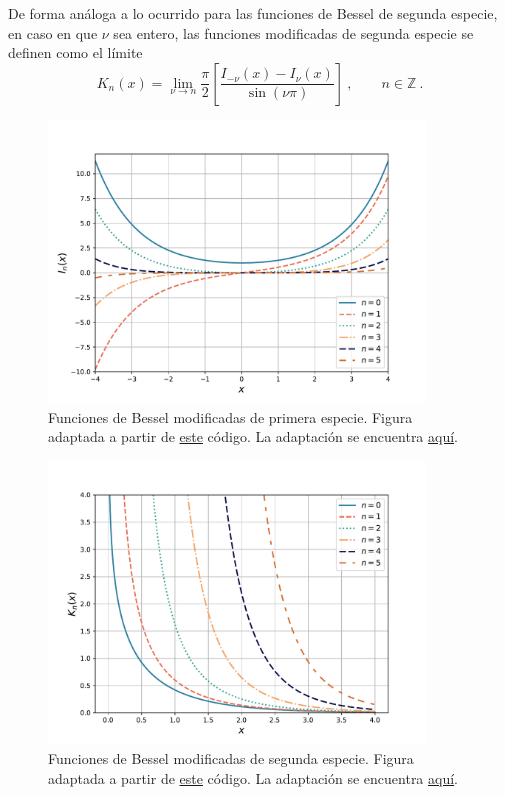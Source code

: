 De forma análoga a lo ocurrido para las funciones de Bessel de segunda especie, en caso en que $\nu$ sea entero, las funciones modificadas de segunda especie se definen como el límite
\begin{equation}
    K_n(x) = \lim_{\nu \to n} \frac{\pi}{2} \left[ \frac{I_{-\nu}(x) - I_\nu(x)}{\sin(\nu \pi)} \right] \ , \qquad n \in \mathbb{Z} \ .
\end{equation}

\begin{figure}[htbp]
    \centering
    \includegraphics[width = 10cm]{Figuras/Bessel-modified-first-kind.pdf}
    \caption{Funciones de Bessel modificadas de primera especie. Figura adaptada a partir de \href{https://github.com/gfrubi/FM2/blob/master/figuras-editables/fig-Bessel.py}{este} código. La adaptación se encuentra \href{https://github.com/Pedroga-cc/Fisica-Matematica-II/blob/main/Figuras/Plotter_Bessel.py}{aquí}.}
    \label{fig:Bessel_modificada_primera}
\end{figure}

\begin{figure}[htbp]
    \centering
    \includegraphics[width = 10cm]{Figuras/Bessel-modified-second-kind.pdf}
    \caption{Funciones de Bessel modificadas de segunda especie. Figura adaptada a partir de \href{https://github.com/gfrubi/FM2/blob/master/figuras-editables/fig-Bessel.py}{este} código. La adaptación se encuentra \href{https://github.com/Pedroga-cc/Fisica-Matematica-II/blob/main/Figuras/Plotter_Bessel.py}{aquí}.}
    \label{fig:Bessel_modificada_segunda}
\end{figure}

